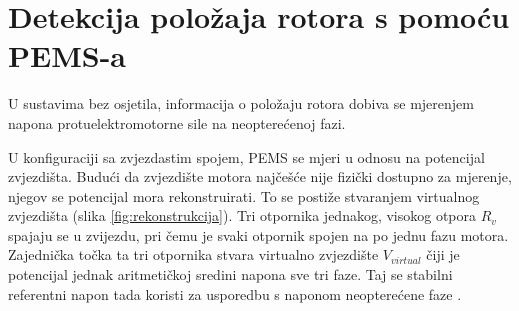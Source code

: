 \documentclass[diplomskirad]{fer}
\begin{document}
\section{Detekcija položaja rotora s pomoću PEMS-a}

U sustavima bez osjetila, informacija o položaju rotora dobiva se mjerenjem
napona protuelektromotorne sile na neopterećenoj fazi.

U konfiguraciji sa zvjezdastim spojem, PEMS se mjeri u odnosu na potencijal
zvjezdišta. Budući da zvjezdište motora najčešće nije fizički dostupno za
mjerenje, njegov se potencijal mora rekonstruirati. To se postiže stvaranjem
virtualnog zvjezdišta (slika \ref{fig:rekonstrukcija}). Tri otpornika jednakog,
visokog otpora $R_v$ spajaju se u zvijezdu, pri čemu je svaki otpornik spojen
na po jednu fazu motora. Zajednička točka ta tri otpornika stvara virtualno
zvjezdište $V_{virtual}$ čiji je potencijal jednak aritmetičkoj sredini napona
sve tri faze. Taj se stabilni referentni napon tada koristi za usporedbu s
naponom neopterećene faze \cite{ST_AN1946}.
\end{document}
